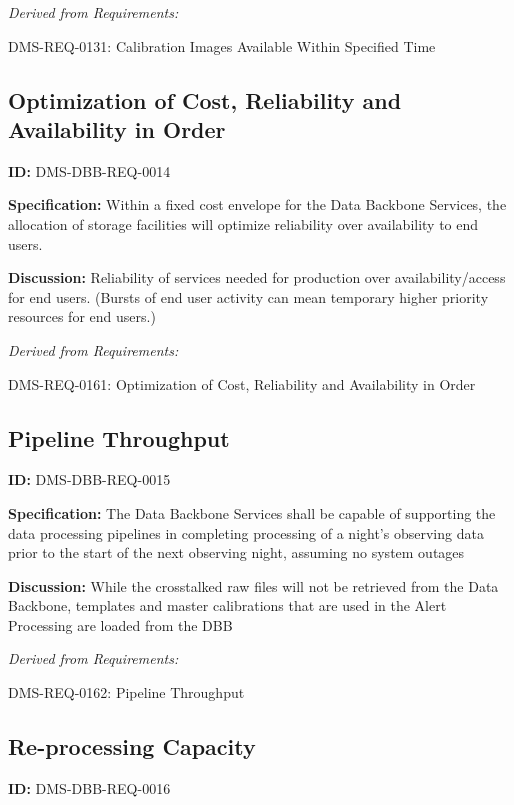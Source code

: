 \documentclass[SE,toc]{lsstdoc}
\begin{document}
\emph{Derived from Requirements:}

DMS-REQ-0131:
Calibration Images Available Within Specified Time \newline

\subsection{Optimization of Cost, Reliability and Availability in Order}

\label{DMS-DBB-REQ-0014}
\textbf{ID:} DMS-DBB-REQ-0014

\textbf{Specification:}
Within a fixed cost envelope for the Data Backbone Services, the allocation of storage facilities will optimize reliability over availability to end users.

\textbf{Discussion:}
Reliability of services needed for production over availability/access for end users. (Bursts of end user activity can mean temporary higher priority resources for end users.)

\emph{Derived from Requirements:}

DMS-REQ-0161:
Optimization of Cost, Reliability and Availability in Order \newline

\subsection{Pipeline Throughput}

\label{DMS-DBB-REQ-0015}
\textbf{ID:} DMS-DBB-REQ-0015

\textbf{Specification:}
The Data Backbone Services shall be capable of supporting the data processing pipelines in completing processing of a night’s observing data prior to the start of the next observing night, assuming no system outages

\textbf{Discussion:}
While the crosstalked raw files will not be retrieved from the Data Backbone, templates and master calibrations that are used in the Alert Processing are loaded from the DBB

\emph{Derived from Requirements:}

DMS-REQ-0162:
Pipeline Throughput \newline

\subsection{Re-processing Capacity}

\label{DMS-DBB-REQ-0016}
\textbf{ID:} DMS-DBB-REQ-0016
\end{document}
